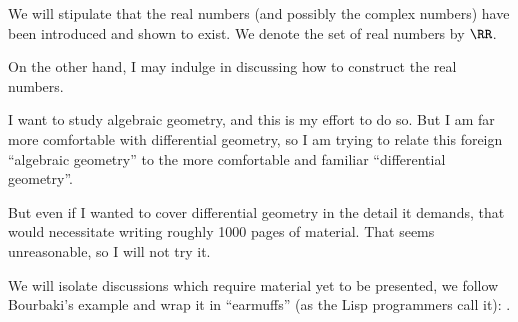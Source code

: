 \begin{remark}
We will stipulate that the real numbers (and possibly the complex
numbers) have been introduced and shown to exist. We denote the set of
real numbers by $\RR$.

On the other hand, I may indulge in discussing how to construct the
real numbers.
\end{remark}

\begin{remark}
I want to study algebraic geometry, and this is my effort to do
so. But I am far more comfortable with differential geometry, so I am
trying to relate this foreign ``algebraic geometry'' to the more
comfortable and familiar ``differential geometry''.

But even if I wanted to cover differential geometry in the detail it
demands, that would necessitate writing roughly 1000 pages of
material. That seems unreasonable, so I will not try it.
\end{remark}

\begin{remark}
We will isolate discussions which require material yet to be
presented, we follow Bourbaki's example and wrap it in ``earmuffs''
(as the Lisp programmers call it): \future{$\cdots$}.
\end{remark}